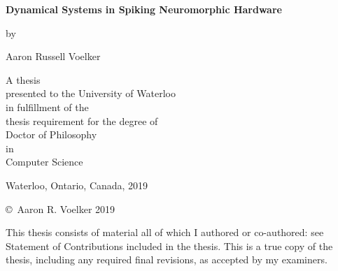 \pagestyle{empty}

\begin{titlepage}
  \begin{center}
    \vspace*{1.0cm}

    \Huge
    {\bf Dynamical Systems in Spiking Neuromorphic Hardware}

    \vspace*{1.0cm}

    \normalsize
    by \\

    \vspace*{1.0cm}

    \Large
    Aaron Russell Voelker \\

    \vspace*{3.0cm}

    \normalsize
    A thesis \\
    presented to the University of Waterloo \\
    in fulfillment of the \\
    thesis requirement for the degree of \\
    Doctor of Philosophy \\
    in \\
    Computer Science \\

    \vspace*{2.0cm}

    Waterloo, Ontario, Canada, 2019 \\

    \vspace*{1.0cm}

    \copyright\ Aaron R. Voelker 2019 \\
  \end{center}
\end{titlepage}

\pagestyle{plain}
\setcounter{page}{2}

\cleardoublepage
{}
{}

\noindent
This thesis consists of material all of which I authored or co-authored: see Statement of Contributions included in the thesis. This is a true copy of the thesis, including any required final revisions, as accepted by my examiners.

